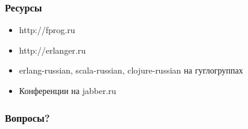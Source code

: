 \documentclass{beamer}
\begin{document}
\begin{frame}
  \frametitle{Ресурсы}
  \begin{itemize}
  \item http://fprog.ru
  \item http://erlanger.ru
  \item erlang-russian, scala-russian, clojure-russian на гуглогруппах
  \item Конференции на jabber.ru
  \end{itemize}
\end{frame}



\begin{frame}
  \frametitle{Вопросы?}
  \titlepage
\end{frame}
\end{document}
